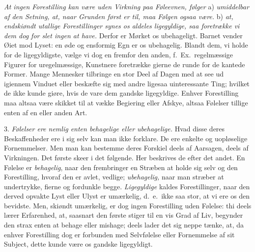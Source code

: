 \documentclass[12pt,a4paper]{article}
\newcommand{\opage}[1]{\marginnote{\footnotesize\textit{[#1]}}}
\begin{document}
\emph{At ingen Forestilling kan være uden Virkning paa Føleevnen, følger} a)
\emph{umiddelbar af den Setning, at, naar Grunden først er til, maa Følgen ogsaa være.}
b) \emph{at, endskiøndt utallige Forestillinger synes os aldeles ligegyldige, saa
foretrække vi dem dog for slet ingen at have.} Derfor er Mørket os ubehageligt. Barnet
vender Øiet mod Lyset: en øde og ensformig Egn er os ubehagelig. Blandt dem, vi holde for
de ligegyldigste, vælge vi dog en fremfor den anden, f.~Ex.\ regelmæssige Figurer for
uregelmæssige, Kunstnere foretrække gierne de runde for de kantede Former. Mange Mennesker
tilbringe en stor
\opage{193} Deel af Dagen med at see ud igiennem Vinduet eller beskæfte sig med andre ligesaa
uinteressante Ting; hvilket de ikke kunde giøre, hvis de vare dem gandske ligegyldige.
Enhver Forestilling maa altsaa være skikket til at vække Begiering eller Afskye, altsaa
Følelser tillige enten af en eller anden Art.

3. \emph{Følelser ere nemlig enten behagelige eller ubehagelige.} Hvad disse deres
Beskaffenheder ere i sig selv kan man ikke forklare. De ere enkelte og uopløselige
Fornemmelser. Men man kan bestemme deres Forskiel deels af Aarsagen, deels af Virkningen.
Det første skeer i det følgende. Her beskrives de efter det andet. En Følelse er
\emph{behagelig}, naar den frembringer en Stræben at holde sig selv og den Forestilling,
hvoraf den er avlet, vedlige; \emph{ubehagelig,} naar man stræber at undertrykke, fierne
og fordunkle begge. \emph{Ligegyldige} kaldes Forestillinger, naar den derved opvakte Lyst
eller Ulyst er umærkelig, d.~e.\ ikke saa stor, at vi ere os den bevidste. Men, skiøndt
umærkelig, er dog ingen Forestilling uden Følelse: thi deels lærer Erfarenhed, at, saasnart
den første stiger til en vis Grad af Liv, begynder den strax enten at behage eller
mishage; deels lader det sig neppe tænke, at, da enhver Forestilling dog er forbunden med
Selvfølelse eller Fornemmelse af sit Subject, dette kunde være os gandske ligegyldigt.
\end{document}
